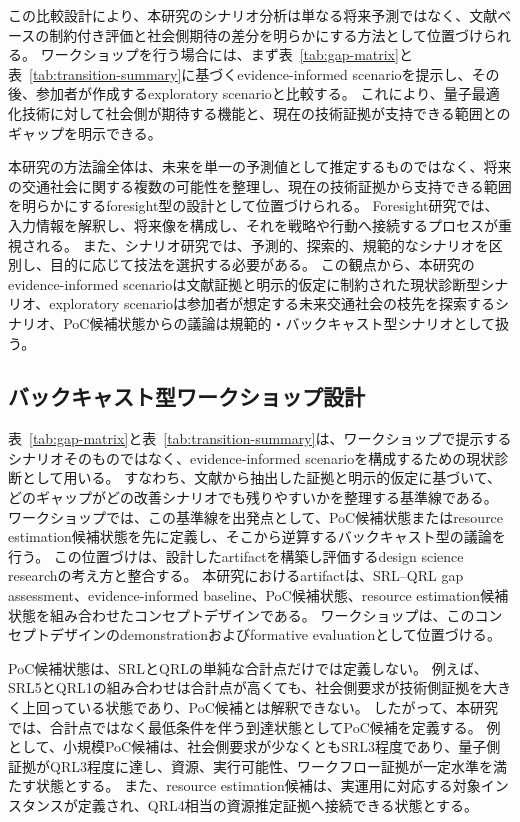 この比較設計により、本研究のシナリオ分析は単なる将来予測ではなく、文献ベースの制約付き評価と社会側期待の差分を明らかにする方法として位置づけられる。
ワークショップを行う場合には、まず表~\ref{tab:gap-matrix}と表~\ref{tab:transition-summary}に基づくevidence-informed scenarioを提示し、その後、参加者が作成するexploratory scenarioと比較する。
これにより、量子最適化技術に対して社会側が期待する機能と、現在の技術証拠が支持できる範囲とのギャップを明示できる。

本研究の方法論全体は、未来を単一の予測値として推定するものではなく、将来の交通社会に関する複数の可能性を整理し、現在の技術証拠から支持できる範囲を明らかにするforesight型の設計として位置づけられる。
Foresight研究では、入力情報を解釈し、将来像を構成し、それを戦略や行動へ接続するプロセスが重視される\cite{voros2003foresight}。
また、シナリオ研究では、予測的、探索的、規範的なシナリオを区別し、目的に応じて技法を選択する必要がある\cite{borjeson2006scenario,popper2008foresightmethods}。
この観点から、本研究のevidence-informed scenarioは文献証拠と明示的仮定に制約された現状診断型シナリオ、exploratory scenarioは参加者が想定する未来交通社会の枝先を探索するシナリオ、PoC候補状態からの議論は規範的・バックキャスト型シナリオとして扱う。

\subsection{バックキャスト型ワークショップ設計}

表~\ref{tab:gap-matrix}と表~\ref{tab:transition-summary}は、ワークショップで提示するシナリオそのものではなく、evidence-informed scenarioを構成するための現状診断として用いる。
すなわち、文献から抽出した証拠と明示的仮定に基づいて、どのギャップがどの改善シナリオでも残りやすいかを整理する基準線である。
ワークショップでは、この基準線を出発点として、PoC候補状態またはresource estimation候補状態を先に定義し、そこから逆算するバックキャスト型の議論を行う。
この位置づけは、設計したartifactを構築し評価するdesign science researchの考え方と整合する。
本研究におけるartifactは、SRL--QRL gap assessment、evidence-informed baseline、PoC候補状態、resource estimation候補状態を組み合わせたコンセプトデザインである。
ワークショップは、このコンセプトデザインのdemonstrationおよびformative evaluationとして位置づける\cite{hevner2004designscience,peffers2007dsrm,venable2016feds}。

PoC候補状態は、SRLとQRLの単純な合計点だけでは定義しない。
例えば、SRL5とQRL1の組み合わせは合計点が高くても、社会側要求が技術側証拠を大きく上回っている状態であり、PoC候補とは解釈できない。
したがって、本研究では、合計点ではなく最低条件を伴う到達状態としてPoC候補を定義する。
例として、小規模PoC候補は、社会側要求が少なくともSRL3程度であり、量子側証拠がQRL3程度に達し、資源、実行可能性、ワークフロー証拠が一定水準を満たす状態とする。
また、resource estimation候補は、実運用に対応する対象インスタンスが定義され、QRL4相当の資源推定証拠へ接続できる状態とする。

